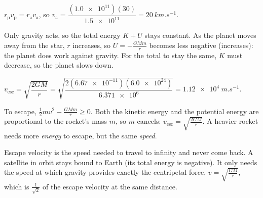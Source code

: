 \documentclass[12pt]{article}
\begin{document}
\ansq
{}
\begin{crit}
\end{crit}
\sample
$r_\mathrm{p}v_\mathrm{p} = r_\mathrm{a}v_\mathrm{a}$, so
$v_\mathrm{a} = \dfrac{(\num{1.0e11})(30)}{\num{1.5e11}} = \qty{20}{km.s^{-1}}$.
\begin{crit}
\end{crit}
\sample
Only gravity acts, so the total energy $K + U$ stays constant. As the planet moves away from the
star, $r$ increases, so $U = -\frac{GMm}{r}$ becomes less negative (increases): the planet does work
against gravity. For the total to stay the same, $K$ must decrease, so the planet slows down.

\ansq
{}
\begin{crit}
\end{crit}
\sample
$v_\mathrm{esc} = \sqrt{\dfrac{2GM}{r}} = \sqrt{\dfrac{2(\num{6.67e-11})(\num{6.0e24})}{\num{6.371e6}}} =
\qty{1.12e4}{m.s^{-1}}$.
\begin{crit}
\end{crit}
\sample
To escape, $\frac{1}{2}mv^2 - \frac{GMm}{r} \ge 0$. Both the kinetic energy and the potential energy are
proportional to the rocket's mass $m$, so $m$ cancels: $v_\mathrm{esc} = \sqrt{\frac{2GM}{r}}$. A
heavier rocket needs more \emph{energy} to escape, but the same \emph{speed}.
\begin{crit}
\end{crit}
\sample
Escape velocity is the speed needed to travel to infinity and never come back. A satellite in orbit
stays bound to Earth (its total energy is negative). It only needs the speed at which gravity
provides exactly the centripetal force, $v = \sqrt{\frac{GM}{r}}$, which is $\frac{1}{\sqrt{2}}$ of the
escape velocity at the same distance.
\end{document}
